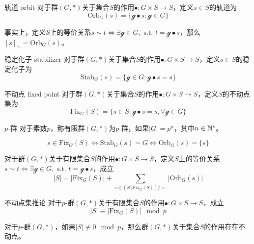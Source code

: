 \begin{definition}{轨道 orbit}
	对于群$(G,*)$关于集合$S$的作用$\bullet:G\times S\to S$，定义$s\in S$的轨道为
	$$
	\mathrm{Orb}_G(s)=\{ \mathcal{g}\bullet s:\mathcal{g}\in G \}
	$$
	
	事实上，定义$S$上的等价关系$s\sim t\iff \exists \mathcal{g}\in G,\text{ s.t. }t=\mathcal{g}\bullet s$，那么$[s]_{\sim}=\mathrm{Orb}_G(s)$。
\end{definition}

\begin{definition}{稳定化子 stabilizer}
	对于群$(G,*)$关于集合$S$的作用$\bullet:G\times S\to S$，定义$s\in S$的稳定化子为
	$$
	\mathrm{Stab}_G(s)=\{ \mathcal{g}\in G:\mathcal{g}\bullet s=s \}
	$$
\end{definition}

\begin{definition}{不动点 fixed point}
	对于群$(G,*)$关于集合$S$的作用$\bullet:G\times S\to S$，定义$S$的不动点集为
	$$
	\mathrm{Fix}_G(S)=\{ s\in S:\mathcal{g}\bullet s=s,\forall \mathcal{g}\in G \}
	$$
\end{definition}

\begin{definition}{$p$-群}
	对于素数$p$，称有限群$(G,*)$为$p$-群，如果$|G|=p^n$，其中$n\in\mathbb{N}^*$。
\end{definition}

\begin{proposition}
	$$
	s\in\mathrm{Fix}_G(S)
	\iff \mathrm{Stab}_G(s)=G
	\iff \mathrm{Orb}_G(s)=\{ s \}
	$$
\end{proposition}

\begin{proposition}
	对于群$(G,*)$关于有限集合$S$的作用$\bullet:G\times S\to S$，定义$S$上的等价关系$s\sim t\iff \exists \mathcal{g}\in G,\text{ s.t. }t=\mathcal{g}\bullet s$，成立
	$$
	|S|=|\mathrm{Fix}_G(S)|+\sum_{s\in (S\setminus\mathrm{Fix}_G(S))/\sim}|\mathrm{Orb}_G(s)|
	$$
\end{proposition}

\begin{corollary}{}{不动点集推论}
	对于$p$-群$(G,*)$关于有限集合$S$的作用$\bullet:G\times S\to S$，成立
	$$
	|S|\equiv |\mathrm{Fix}_G(S)|\mod p
	$$
\end{corollary}

\begin{corollary}
	对于$p$-群$(G,*)$，如果$|S|\not\equiv 0\mod p$，那么群$(G,*)$关于集合$S$的作用存在不动点。
\end{corollary}

